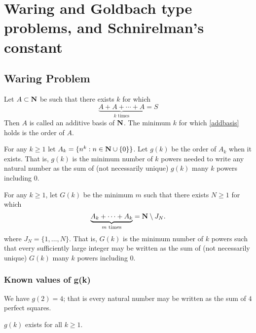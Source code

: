 \chapter{Waring and Goldbach type problems, and Schnirelman's constant}\label{waring-goldbach-schnirelman-chapter}

\section{Waring Problem}

\begin{definition}
    Let $A\subset\mathbf{N}$ be such that there exists $k$ for which
    \begin{equation}
        \underbrace{A+A+\cdots+A}_{k\text{ times}}=S \label{addbasis}
    \end{equation}
    Then $A$ is called an additive basis of $\mathbf{N}$. The minimum $k$ for which \eqref{addbasis} holds is the order of $A$.
\end{definition}

\begin{definition}\label{g(k)}
For any $k\ge1$ let $A_k=\{n^k:n\in\mathbf{N}\cup\{0\}\}$. Let $g(k)$ be the order of $A_k$ when it exists.
That is, $g(k)$ is the minimum number of $k$ powers needed to write any natural number as the sum of (not necessarily unique) $g(k)$ many $k$ powers including 0.
\end{definition}

\begin{definition}\label{G(k)}
For any $k\ge1$, let $G(k)$ be the minimum $m$ such that there exists $N\ge1$ for which
$$\underbrace{A_k+\cdots+A_k}_{m\text{ times}}=\mathbf{N}\setminus J_N.$$
where $J_N=\{1,\dots,N\}$.
That is, $G(k)$ is the minimum number of $k$ powers such that every sufficiently large integer may be written as the sum of (not necessarily unique) $G(k)$ many $k$ powers including 0.
\end{definition}

\subsection{Known values of g(k)}

\begin{theorem}
We have $g(2)=4$; that is every natural number may be written as the sum of $4$ perfect squares.
\end{theorem}

\begin{theorem}
$g(k)$ exists for all $k\ge1$.
\label{HilbertExistence}
\end{theorem}


